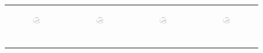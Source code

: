 \begin{figure}[ht]
\begin{tabular}{cccc}
	  \begin{subfigure}[b]{0.22\textwidth}
	  	\includegraphics[width=105pt]{images/speedup_friendster10M_maxgraphcut.pdf}
			\caption{}
			\label{appfig:speedup_friendster10M_maxgraphcut}
	  \end{subfigure} &
	  \begin{subfigure}[b]{0.22\textwidth}
	  	\includegraphics[width=105pt]{images/speedup_arabic2005_maxgraphcut.pdf}
			\caption{}
			\label{appfig:speedup_arabic2005_maxgraphcut}
	  \end{subfigure} &
	  \begin{subfigure}[b]{0.22\textwidth}
	  	\includegraphics[width=105pt]{images/speedup_uk2005_maxgraphcut.pdf}
			\caption{}
			\label{appfig:speedup_uk2005_maxgraphcut}
	  \end{subfigure} &
	  \begin{subfigure}[b]{0.22\textwidth}
	  	\includegraphics[width=105pt]{images/speedup_it2004_maxgraphcut.pdf}
			\caption{}
			\label{appfig:speedup_it2004_maxgraphcut}
	  \end{subfigure} \\
	  \begin{subfigure}[b]{0.22\textwidth}

\end{subfigure}
\end{tabular}
\end{figure}

